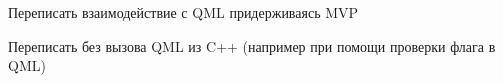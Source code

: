 
\begin{DoxyRefList}
\item[Класс \mbox{\hyperlink{classConfigurator}{Configurator}} ]\label{todo__todo000001}%
%
Переписать взаимодействие с QML придерживаясь MVP 
\item[Член \mbox{\hyperlink{group__radiooooo__signals_gac858a8e6164ce86d1d2c1b05bea806a3}{Radiooooo\+::force\+Pause}} ()]\label{todo__todo000002}%
%
Переписать без вызова QML из C++ (например при помощи проверки флага в QML) 
\end{DoxyRefList}